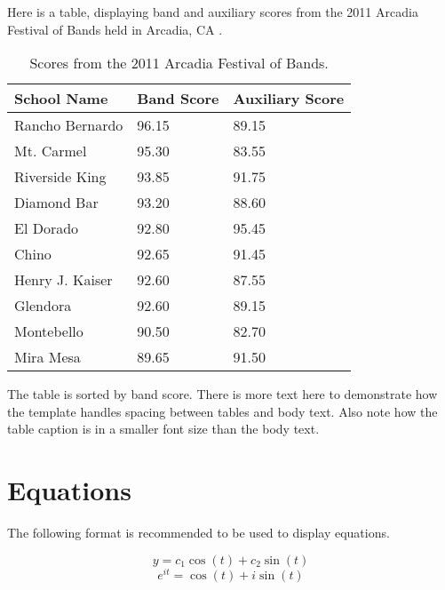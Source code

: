 Here is a table, displaying band and auxiliary scores from the 2011 Arcadia Festival of Bands held in Arcadia, CA \cite{ARCADIA}.

\begin{table}[!htb]
	\centering
	\begin{tabular}{|l|l|l|}
		\hline
		School Name 	& Band Score	& Auxiliary Score \\ \hline
		Rancho Bernardo & 96.15 		& 89.15 \\ \hline
		Mt. Carmel 		& 95.30 		& 83.55 \\ \hline
		Riverside King 	& 93.85 		& 91.75 \\ \hline
		Diamond Bar 	& 93.20 		& 88.60 \\ \hline
		El Dorado 		& 92.80 		& 95.45 \\ \hline
		Chino 			& 92.65 		& 91.45 \\ \hline
		Henry J. Kaiser & 92.60 		& 87.55 \\ \hline
		Glendora 		& 92.60 		& 89.15 \\ \hline
		Montebello 		& 90.50 		& 82.70 \\ \hline
		Mira Mesa 		& 89.65 		& 91.50 \\ \hline
	\end{tabular}
	\caption{Scores from the 2011 Arcadia Festival of Bands.}
	\label{Band}
\end{table}

The table is sorted by band score. There is more text here to demonstrate how the template handles spacing between tables and body text. Also note how the table caption is in a smaller font size than the body text.

\section{Equations}

The following format is recommended to be used to display equations.

\begin{equation} \label{Equ.2.1}
	y=c_1\cos(t)+c_2\sin(t)
\end{equation}
\begin{equation} \label{Equ.2.2}
	e^{it}=\cos(t)+i\sin(t)
\end{equation}

